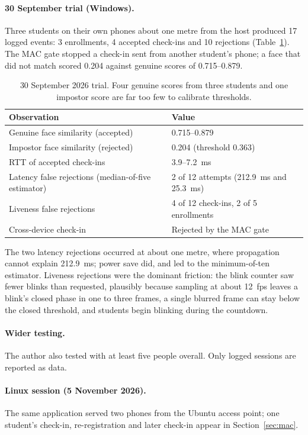 \documentclass[11pt,a4paper]{article}
\begin{document}
\paragraph{30 September trial (Windows).} Three students on their own phones about one metre from the host produced 17 logged events: 3 enrollments, 4 accepted check-ins and 10 rejections (Table~\ref{tab:sep}). The MAC gate stopped a check-in sent from another student's phone; a face that did not match scored 0.204 against genuine scores of 0.715--0.879.

\begin{table}[t]
\centering
\small
\begin{tabular}{@{}p{6.2cm}p{7.8cm}@{}}
\toprule
Observation & Value \\
\midrule
Genuine face similarity (accepted) & 0.715--0.879 \\
Impostor face similarity (rejected) & 0.204 (threshold 0.363) \\
RTT of accepted check-ins & 3.9--7.2~ms \\
Latency false rejections (median-of-five estimator) & 2 of 12 attempts (212.9~ms and 25.3~ms) \\
Liveness false rejections & 4 of 12 check-ins, 2 of 5 enrollments \\
Cross-device check-in & Rejected by the MAC gate \\
\bottomrule
\end{tabular}
\caption{30 September 2026 trial. Four genuine scores from three students and one impostor score are far too few to calibrate thresholds.}
\label{tab:sep}
\end{table}

The two latency rejections occurred at about one metre, where propagation cannot explain 212.9~ms; power save did, and led to the minimum-of-ten estimator. Liveness rejections were the dominant friction: the blink counter saw fewer blinks than requested, plausibly because sampling at about 12~fps leaves a blink's closed phase in one to three frames, a single blurred frame can stay below the closed threshold, and students begin blinking during the countdown.

\paragraph{Wider testing.} The author also tested with at least five people overall. Only logged sessions are reported as data.

\paragraph{Linux session (5 November 2026).} The same application served two phones from the Ubuntu access point; one student's check-in, re-registration and later check-in appear in Section~\ref{sec:mac}.
\end{document}
